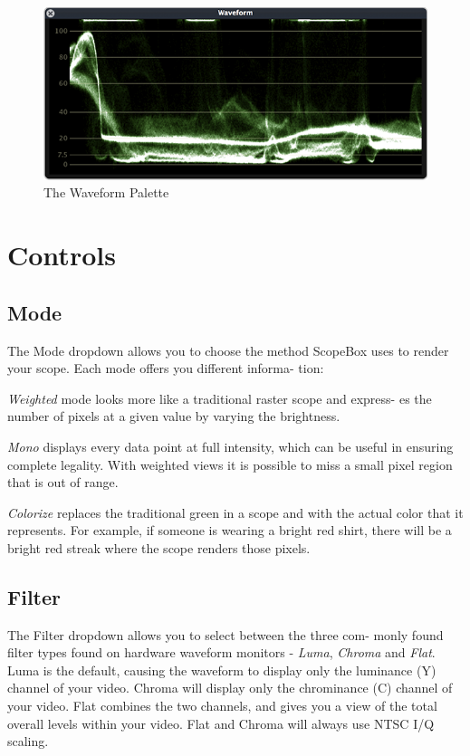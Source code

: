 \documentclass[10,letterpaper,]{report}
\begin{document}
\begin{figure}[htbp]
\centering
\includegraphics{images/waveform-wide.png}
\caption{The Waveform Palette}
\end{figure}

\section{Controls}

\subsection{Mode}

The Mode dropdown allows you to choose the method ScopeBox uses to
render your scope. Each mode offers you different informa- tion:

\emph{Weighted} mode looks more like a traditional raster scope and
express- es the number of pixels at a given value by varying the
brightness.

\emph{Mono} displays every data point at full intensity, which can be
useful in ensuring complete legality. With weighted views it is possible
to miss a small pixel region that is out of range.

\emph{Colorize} replaces the traditional green in a scope and with the
actual color that it represents. For example, if someone is wearing a
bright red shirt, there will be a bright red streak where the scope
renders those pixels.

\subsection{Filter}

The Filter dropdown allows you to select between the three com- monly
found filter types found on hardware waveform monitors - \emph{Luma},
\emph{Chroma} and \emph{Flat}. Luma is the default, causing the waveform
to display only the luminance (Y) channel of your video. Chroma will
display only the chrominance (C) channel of your video. Flat combines
the two channels, and gives you a view of the total overall levels
within your video. Flat and Chroma will always use NTSC I/Q scaling.
\end{document}
